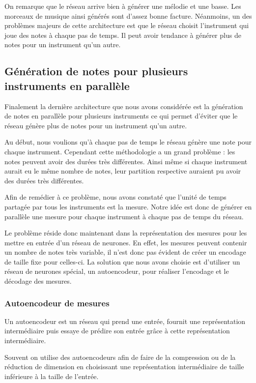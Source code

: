 On remarque que le réseau arrive bien à générer une mélodie et une basse. Les morceaux de musique ainsi générés sont d'assez bonne facture. Néanmoins, un des problèmes majeurs de cette architecture est que le réseau choisit l'instrument qui joue des notes à chaque pas de temps. Il peut avoir tendance à générer plus de notes pour un instrument qu'un autre.



\subsection{Génération de notes pour plusieurs instruments en parallèle}

Finalement la dernière architecture que nous avons considérée est la génération de notes en parallèle pour plusieurs instruments ce qui permet d'éviter que le réseau génère plus de notes pour un instrument qu'un autre.

Au début, nous voulions qu'à chaque pas de temps le réseau génère une note pour chaque instrument. Cependant cette méthodologie a un grand problème : les notes peuvent avoir des durées très différentes. Ainsi même si chaque instrument aurait eu le même nombre de notes, leur partition respective auraient pu avoir des durées très différentes.

Afin de remédier à ce problème, nous avons constaté que l'unité de temps partagée par tous les instruments est la mesure. Notre idée est donc de générer en parallèle une mesure pour chaque instrument à chaque pas de temps du réseau.

Le problème réside donc maintenant dans la représentation des mesures pour les mettre en entrée d'un réseau de neurones. En effet, les mesures peuvent contenir un nombre de notes très variable, il n'est donc pas évident de créer un encodage de taille fixe pour celles-ci. La solution que nous avons choisie est d'utiliser un réseau de neurones spécial, un autoencodeur, pour réaliser l'encodage et le décodage des mesures.

\subsubsection{Autoencodeur de mesures}

Un autoencodeur est un réseau qui prend une entrée, fournit une représentation intermédiaire puis essaye de prédire son entrée grâce à cette représentation intermédiaire.

Souvent on utilise des autoencodeurs afin de faire de la compression ou de la réduction de dimension en choisissant une représentation intermédiaire de taille inférieure à la taille de l'entrée.

